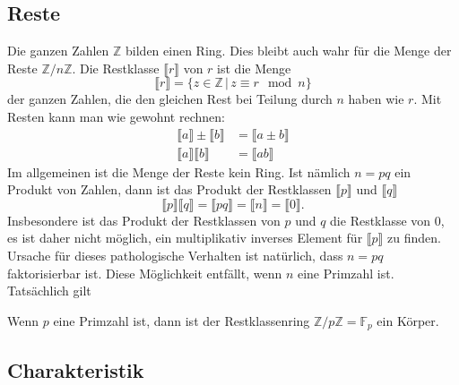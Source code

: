 \subsection{Reste}
Die ganzen Zahlen $\mathbb Z$ bilden einen Ring.
Dies bleibt auch wahr für die Menge der Reste $\mathbb Z/n\mathbb Z$.
Die Restklasse $\llbracket r\rrbracket$ von $r$ ist die Menge
\[
\llbracket
r
\rrbracket
=
\{ z\in\mathbb Z\,|\, z\equiv r\mod n\}
\]
der ganzen Zahlen, die den gleichen Rest bei Teilung durch $n$ haben
wie $r$.
Mit Resten kann man wie gewohnt rechnen:
\begin{align*}
\llbracket a \rrbracket
\pm
\llbracket b \rrbracket
&=
\llbracket a\pm b \rrbracket
\\
\llbracket a \rrbracket
\llbracket b \rrbracket
&=
\llbracket ab \rrbracket
\end{align*}
Im allgemeinen ist die Menge der Reste kein Ring.
Ist nämlich $n=pq$ ein Produkt von Zahlen, dann ist das Produkt der
Restklassen
$\llbracket p\rrbracket$
und
$\llbracket q\rrbracket$
\[
\llbracket p\rrbracket
\llbracket q\rrbracket
=
\llbracket pq\rrbracket
=
\llbracket n\rrbracket
=
\llbracket 0\rrbracket.
\]
Insbesondere ist das Produkt der Restklassen von $p$ und $q$ die
Restklasse von $0$, es ist daher nicht möglich, ein multiplikativ
inverses Element für $\llbracket p \rrbracket$ zu finden.
Ursache für dieses pathologische Verhalten ist natürlich, dass $n=pq$
faktorisierbar ist.
Diese Möglichkeit entfällt, wenn $n$ eine Primzahl ist.
Tatsächlich gilt

\begin{satz}
Wenn $p$ eine Primzahl ist, dann ist der Restklassenring
$\mathbb Z/p\mathbb Z=\mathbb F_p$ ein Körper.
\end{satz}

%
%
\subsection{Charakteristik}

%
%
